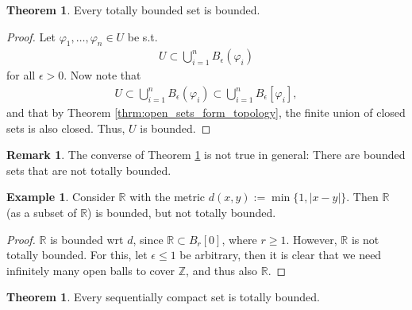 \documentclass[12pt, a4paper]{article}
\numberwithin{equation}{section}
\theoremstyle{definition}
\theoremstyle{definition}
\newtheorem{exmp}[thm]{Example} %
\newtheorem{remark}[thm]{Remark} %
\newtheorem{theorem}[thm]{Theorem}
\newcommand{\abs}[1]{\left\vert #1 \right\vert}
\begin{document}
	\begin{theorem}\label{thrm:totally_bounded_set_bounded}
		Every totally bounded set is bounded.
	\end{theorem}

	\begin{proof}
		Let $\varphi_1, \dots, \varphi_n\in U$ be s.t.
		\begin{align*}
			U\subset \bigcup_{i = 1}^{n}B_{\epsilon}(\varphi_i)
		\end{align*}
		for all $\epsilon > 0$. Now note that
		\begin{align*}
			U\subset \bigcup_{i = 1}^{n}B_{\epsilon}(\varphi_i) \subset \bigcup_{i = 1}^{n}B_{\epsilon}[\varphi_i],
		\end{align*}
		and that by Theorem \ref{thrm:open_sets_form_topology}, the finite union of closed sets is also closed. Thus, $U$ is bounded.
	\end{proof}

	\begin{remark}
		The converse of Theorem \ref{thrm:totally_bounded_set_bounded} is not true in general: There are bounded sets that are not totally bounded.
	\end{remark}

	\begin{exmp}
		Consider $\mathbb R$ with the metric $d(x, y) := \min\{ 1, \abs{x - y} \}$. Then $\mathbb R$ (as a subset of $\mathbb R$) is bounded, but not totally bounded.
	\end{exmp}

	\begin{proof}
		$\mathbb R$ is bounded wrt $d$, since $\mathbb R \subset B_{r}[0]$, where $r \geq 1$. However, $\mathbb R$ is not totally bounded. For this, let $\epsilon\leq 1$ be arbitrary, then it is clear that we need infinitely many open balls to cover $\mathbb Z$, and thus also $\mathbb R$.
	\end{proof}
	
	\begin{theorem}\label{thrm:seq_compact_set_tot_bound}
		Every sequentially compact set is totally bounded.
	\end{theorem}
\end{document}
